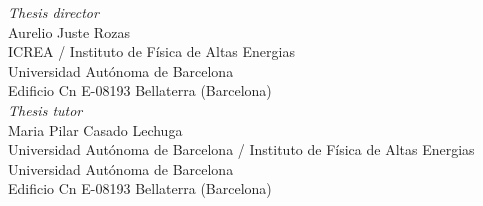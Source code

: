 \begin{titlepage}
\begin{center}
\par
\vspace{0.5in}

\vfill
{\it Thesis director}\\
Aurelio Juste Rozas \\
ICREA / Instituto de F\'{i}sica de Altas Energias\\
Universidad Aut\'{o}noma de Barcelona\\
Edificio Cn E-08193 Bellaterra (Barcelona) \\
\vspace{0.5cm}
{\it Thesis tutor}\\
Maria Pilar Casado Lechuga \\
Universidad Aut\'{o}noma de Barcelona / Instituto de F\'{i}sica de Altas Energias\\
Universidad Aut\'{o}noma de Barcelona\\
Edificio Cn E-08193 Bellaterra (Barcelona)
\end{center}
\end{titlepage}

